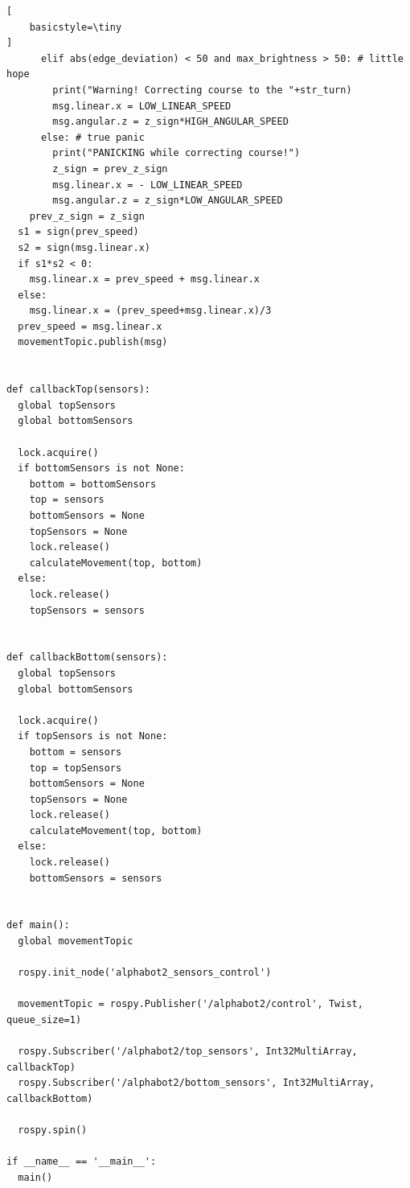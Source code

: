 \documentclass[conference]{IEEEtran}
\begin{document}
\begin{lstlisting}[
    basicstyle=\tiny
]
      elif abs(edge_deviation) < 50 and max_brightness > 50: # little hope
        print("Warning! Correcting course to the "+str_turn)
        msg.linear.x = LOW_LINEAR_SPEED
        msg.angular.z = z_sign*HIGH_ANGULAR_SPEED
      else: # true panic
        print("PANICKING while correcting course!")
        z_sign = prev_z_sign
        msg.linear.x = - LOW_LINEAR_SPEED
        msg.angular.z = z_sign*LOW_ANGULAR_SPEED
    prev_z_sign = z_sign
  s1 = sign(prev_speed)
  s2 = sign(msg.linear.x)
  if s1*s2 < 0:
    msg.linear.x = prev_speed + msg.linear.x
  else:
    msg.linear.x = (prev_speed+msg.linear.x)/3
  prev_speed = msg.linear.x
  movementTopic.publish(msg)


def callbackTop(sensors):
  global topSensors
  global bottomSensors

  lock.acquire()
  if bottomSensors is not None:
    bottom = bottomSensors
    top = sensors
    bottomSensors = None
    topSensors = None
    lock.release()
    calculateMovement(top, bottom)
  else:
    lock.release()
    topSensors = sensors


def callbackBottom(sensors):
  global topSensors
  global bottomSensors

  lock.acquire()
  if topSensors is not None:
    bottom = sensors
    top = topSensors
    bottomSensors = None
    topSensors = None
    lock.release()
    calculateMovement(top, bottom)
  else:
    lock.release()
    bottomSensors = sensors


def main():
  global movementTopic

  rospy.init_node('alphabot2_sensors_control')

  movementTopic = rospy.Publisher('/alphabot2/control', Twist, queue_size=1)

  rospy.Subscriber('/alphabot2/top_sensors', Int32MultiArray, callbackTop)
  rospy.Subscriber('/alphabot2/bottom_sensors', Int32MultiArray, callbackBottom)

  rospy.spin()

if __name__ == '__main__':
  main()
\end{lstlisting}
\end{document}
